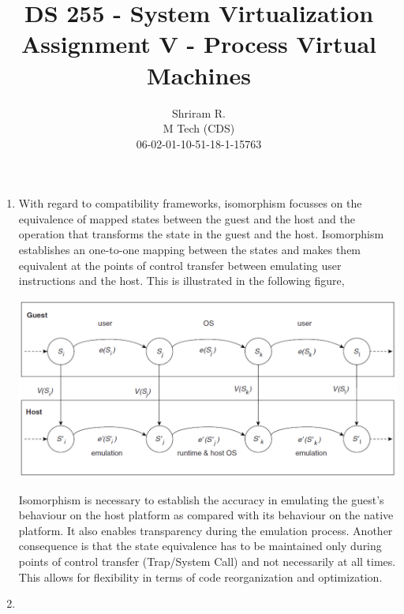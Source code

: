 \documentclass[11pt,a4paper,oneside]{article}
\begin{document}
	\title{DS 255 - System Virtualization \\ Assignment V - Process Virtual Machines}
	\author{Shriram R. \\ M Tech (CDS) \\ 06-02-01-10-51-18-1-15763}
	\maketitle	
	
	\begin{enumerate}
		\item With regard to compatibility frameworks, isomorphism focusses on the equivalence of mapped states between the guest and the host and the operation that transforms the state in the guest and the host. Isomorphism establishes an one-to-one mapping between the states and makes them equivalent at the points of control transfer between emulating user instructions and the host. This is illustrated in the following figure,		
				\begin{center}
				   \includegraphics[scale=0.4]{1.png}
				\end{center}
		Isomorphism is necessary to establish the accuracy in emulating the guest's behaviour on the host platform as compared with its behaviour on the native platform. It also enables transparency during the emulation process. Another consequence is that the state equivalence has to be maintained only during points of control transfer (Trap/System Call) and not necessarily at all times. This allows for flexibility in terms of code reorganization and optimization. 
		
		\item 
		

\end{enumerate}
\end{document}
